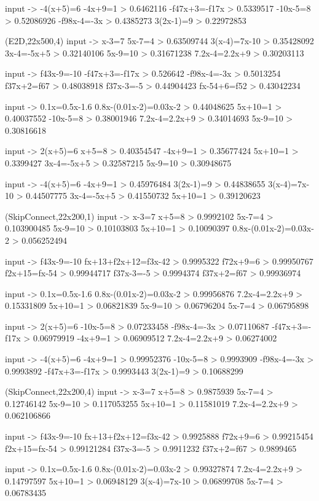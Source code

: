 input -> -4(x+5)=6
-4x+9=1 > 0.6462116
-f{4}{7}x+3=-f{1}{7}x > 0.5339517
-10x-5=8 > 0.52086926
-f{9}{8}x-4=-3x > 0.4385273
3(2x-1)=9 > 0.22972853

(E2D,22x500,4)
input -> x-3=7
5x-7=4 > 0.63509744
3(x-4)=7x-10 > 0.35428092
3x-4=-5x+5 > 0.32140106
5x-9=10 > 0.31671238
7.2x-4=2.2x+9 > 0.30203113

input -> f{4}{3}x-9=-10
-f{4}{7}x+3=-f{1}{7}x > 0.526642
-f{9}{8}x-4=-3x > 0.5013254
f{3}{7}x+2=f{6}{7} > 0.48038918
f{3}{7}x-3=-5 > 0.44904423
f{x-5}{4}+6=f{5}{2} > 0.43042234

input -> 0.1x=0.5x-1.6
0.8x-(0.01x-2)=0.03x-2 > 0.44048625
5x+10=1 > 0.40037552
-10x-5=8 > 0.38001946
7.2x-4=2.2x+9 > 0.34014693
5x-9=10 > 0.30816618

input -> 2(x+5)=6
x+5=8 > 0.40354547
-4x+9=1 > 0.35677424
5x+10=1 > 0.3399427
3x-4=-5x+5 > 0.32587215
5x-9=10 > 0.30948675

input -> -4(x+5)=6
-4x+9=1 > 0.45976484
3(2x-1)=9 > 0.44838655
3(x-4)=7x-10 > 0.44507775
3x-4=-5x+5 > 0.41550732
5x+10=1 > 0.39120623

(SkipConnect,22x200,1)
input -> x-3=7
x+5=8 > 0.9992102
5x-7=4 > 0.103900485
5x-9=10 > 0.10103803
5x+10=1 > 0.10090397
0.8x-(0.01x-2)=0.03x-2 > 0.056252494

input -> f{4}{3}x-9=-10
f{x+1}{3}+f{2x+1}{2}=f{3x-4}{2} > 0.9995322
f{7}{2}x+9=6 > 0.99950767
f{2x+1}{5}=f{x-5}{4} > 0.99944717
f{3}{7}x-3=-5 > 0.9994374
f{3}{7}x+2=f{6}{7} > 0.99936974

input -> 0.1x=0.5x-1.6
0.8x-(0.01x-2)=0.03x-2 > 0.99956876
7.2x-4=2.2x+9 > 0.15331809
5x+10=1 > 0.06821839
5x-9=10 > 0.06796204
5x-7=4 > 0.06795898

input -> 2(x+5)=6
-10x-5=8 > 0.07233458
-f{9}{8}x-4=-3x > 0.07110687
-f{4}{7}x+3=-f{1}{7}x > 0.06979919
-4x+9=1 > 0.06909512
7.2x-4=2.2x+9 > 0.06274002

input -> -4(x+5)=6
-4x+9=1 > 0.99952376
-10x-5=8 > 0.9993909
-f{9}{8}x-4=-3x > 0.9993892
-f{4}{7}x+3=-f{1}{7}x > 0.9993443
3(2x-1)=9 > 0.10688299

(SkipConnect,22x200,4)
input -> x-3=7
x+5=8 > 0.9875939
5x-7=4 > 0.12746142
5x-9=10 > 0.117053255
5x+10=1 > 0.11581019
7.2x-4=2.2x+9 > 0.062106866

input -> f{4}{3}x-9=-10
f{x+1}{3}+f{2x+1}{2}=f{3x-4}{2} > 0.9925888
f{7}{2}x+9=6 > 0.99215454
f{2x+1}{5}=f{x-5}{4} > 0.99121284
f{3}{7}x-3=-5 > 0.9911232
f{3}{7}x+2=f{6}{7} > 0.9899465

input -> 0.1x=0.5x-1.6
0.8x-(0.01x-2)=0.03x-2 > 0.99327874
7.2x-4=2.2x+9 > 0.14797597
5x+10=1 > 0.06948129
3(x-4)=7x-10 > 0.06899708
5x-7=4 > 0.06783435


